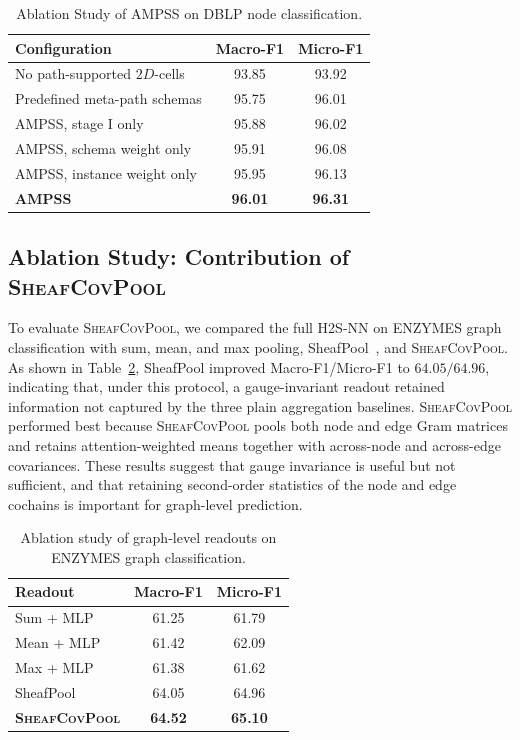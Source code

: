 \documentclass[sigconf,anonymous,review]{acmart}
\newcommand{\method}{\textsc{H2S-NN}}
\newcommand{\ampss}{\textsc{AMPSS}}
\newcommand{\sheafcovpool}{\textsc{SheafCovPool}}
\begin{document}
\begin{table}[H]
  \centering
  \caption{Ablation Study of \ampss{} on DBLP node classification.}
  \label{tab:ablation-schema}
  \small
  \begin{tabular}{lcc}
    \toprule
    \textbf{Configuration} & Macro-F1 & Micro-F1 \\
    \midrule
    No path-supported \(2D\)-cells & 93.85 & 93.92 \\
    Predefined meta-path schemas & 95.75 & 96.01 \\
    \ampss{}, stage I only & 95.88 & 96.02 \\
    \ampss{}, schema weight only & 95.91 & 96.08 \\
    \ampss{}, instance weight only & 95.95 & 96.13 \\
    \textbf{\ampss{}} & \textbf{96.01} & \textbf{96.31} \\
    \bottomrule
  \end{tabular}
\end{table}

\subsection{Ablation Study: Contribution of {\sheafcovpool{}}}

To evaluate \sheafcovpool{}, we compared the full \method{} on ENZYMES graph classification with sum, mean, and max pooling, SheafPool~\cite{braithwaite2024heterogeneous}, and \sheafcovpool{}. As shown in Table~\ref{tab:ablation-pooling}, SheafPool improved Macro-F1/Micro-F1 to \(64.05/64.96\), indicating that, under this protocol, a gauge-invariant readout retained information not captured by the three plain aggregation baselines. \sheafcovpool{} performed best because \sheafcovpool{} pools both node and edge Gram matrices and retains attention-weighted means together with across-node and across-edge covariances. These results suggest that gauge invariance is useful but not sufficient, and that retaining second-order statistics of the node and edge cochains is important for graph-level prediction.
\begin{table}[H]
  \centering
  \caption{Ablation study of graph-level readouts on ENZYMES graph classification.}
  \label{tab:ablation-pooling}
  \small
  \begin{tabular}{lcc}
    \toprule
    \textbf{Readout} & Macro-F1 & Micro-F1 \\
    \midrule
    Sum + MLP & 61.25 & 61.79 \\
    Mean + MLP & 61.42 & 62.09 \\
    Max + MLP & 61.38 & 61.62 \\
    SheafPool & 64.05 & 64.96 \\
    \textbf{\sheafcovpool{}} & \textbf{64.52} & \textbf{65.10} \\
    \bottomrule
  \end{tabular}
\end{table}
\end{document}
